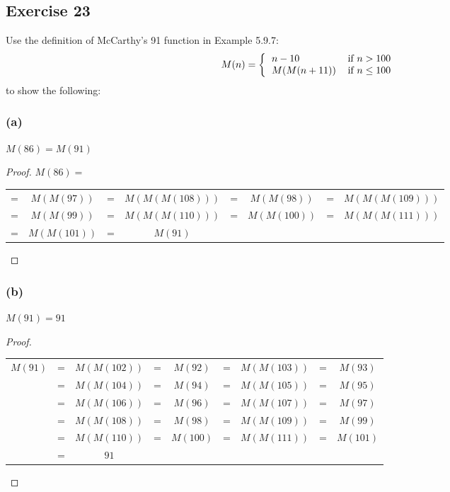 \documentclass[14pt]{extarticle}
\begin{document}
\subsection{Exercise 23}
Use the definition of McCarthy’s 91 function in Example 5.9.7:
\[
M(n) =
\left\{
\begin{tabular}{lr}
$n - 10$ & if \(n > 100\) \\
\(M(M(n+11))\) & if \(n \leq 100\)
\end{tabular}
\right.
\]
to show the following:

\subsubsection{(a)}
\(M(86) = M(91)\)

\begin{proof}
$M(86) = $
\begin{center}
\begin{tabular}{cccccccc}
= & \(M(M(97))\) & = & \(M(M(M(108)))\) & = & \(M(M(98))\) & = & \(M(M(M(109)))\) \\
= & \(M(M(99))\) & = & \(M(M(M(110)))\) & = & \(M(M(100))\) & = & \(M(M(M(111)))\) \\
= & \(M(M(101))\) & = & \(M(91)\) & & & &
\end{tabular}
\end{center}
\end{proof}

\subsubsection{(b)}
\(M(91) = 91\)

\begin{proof}
\begin{center}
\begin{tabular}{ccccccccc}
\(M(91)\) & = & \(M(M(102))\) & = & \(M(92)\) & = & \(M(M(103))\) & = & \(M(93)\) \\
& = & \(M(M(104))\) & = & \(M(94)\) & = & \(M(M(105))\) & = & \(M(95)\) \\
& = & \(M(M(106))\) & = & \(M(96)\) & = & \(M(M(107))\) & = & \(M(97)\) \\
& = & \(M(M(108))\) & = & \(M(98)\) & = & \(M(M(109))\) & = & \(M(99)\) \\
& = & \(M(M(110))\) & = & \(M(100)\) & = & \(M(M(111))\) & = & \(M(101)\) \\
& = & \(91\) & & & & & &
\end{tabular}
\end{center}
\end{proof}
\end{document}
